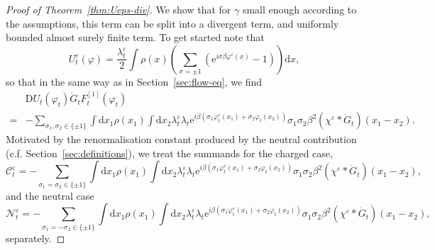 \documentclass[11pt, a4paper]{scrartcl}
\numberwithin{equation}{section}
\theoremstyle{plain}
\theoremstyle{remark}
\newcommand{\Iota}{\mathrm{I}}
\newcommand{\mathD}{\mathrm{D}}
\newcommand{\mathd}{\mathrm{d}}
\newcommand{\mathe}{\mathrm{e}}
\newcommand{\tmtextbf}[1]{\text{{\bfseries{#1}}}}
\begin{document}
\begin{proof}[Proof of Theorem~\ref{thm:Ueps-div}]
  \tmtextbf{$(\Iota \Iota^{\varepsilon}_1)$} We show that for $\gamma$ small
  enough according to the assumptions, this term can be split into a divergent
  term, and uniformly bounded almost surely finite term. To get started note
  that
  \[ U^{\varepsilon}_t (\varphi) = \frac{\lambda_t^{\varepsilon}}{2} \int
     \rho (x) \left( \sum_{\sigma = \pm 1} (\mathe^{i \sigma \beta
     \varphi^{\varepsilon} (x)} - 1) \right) \mathd x, \]
  so that in the same way as in Section~\ref{sec:flow-eq}, we find
  \begin{align*}
    &\mathD U_t (\varphi_t) \dot{G}_t F^{[1]}_t (\varphi_t) \\
    =& -
     \sum_{\sigma_1, \sigma_2 \in \{ \pm 1 \}} \int \mathd x_1 \rho (x_1) \int
     \mathd x_2 \lambda_t^{\varepsilon} \lambda_t \mathe^{i \beta (\sigma_1
     \varphi^{\varepsilon}_t (x_1) + \sigma_2 \varphi_t (x_2))} \sigma_1
     \sigma_2 \beta^2 (\chi^{\varepsilon} \ast \dot{G}_t ) (x_1 - x_2) .
  \end{align*}
  Motivated by the renormalisation constant produced by the neutral
  contribution (c.f. Section~\ref{sec:definitions}), we treat the summands for
  the charged case,
  {\small\[ \mathcal{C}^{\varepsilon}_t = - \sum_{\sigma_1 = \sigma_2 \in \{ \pm 1
     \}} \int \mathd x_1 \rho (x_1) \int \mathd x_2 \lambda_t^{\varepsilon}
     \lambda_t \mathe^{i \beta (\sigma_1 \varphi^{\varepsilon}_t (x_1) +
     \sigma_2 \varphi_t (x_2))} \sigma_1 \sigma_2 \beta^2 (\chi^{\varepsilon}
     \ast \dot{G}_t ) (x_1 - x_2), \]}
  and the neutral case
  {\small\[ \mathcal{N}^{\varepsilon}_t = - \sum_{\sigma_1 = - \sigma_2 \in \{ \pm 1
     \}} \int \mathd x_1 \rho (x_1) \int \mathd x_2 \lambda_t^{\varepsilon}
     \lambda_t \mathe^{i \beta (\sigma_1 \varphi^{\varepsilon}_t (x_1) +
     \sigma_2 \varphi_t (x_2))} \sigma_1 \sigma_2 \beta^2 (\chi^{\varepsilon}
     \ast \dot{G}_t ) (x_1 - x_2), \]}
  separately.
  

\end{proof}
\end{document}
